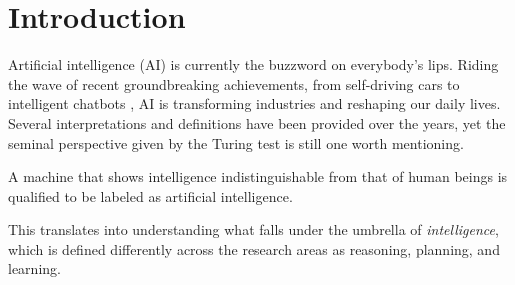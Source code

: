 \documentclass[a4paper,12pt,times,numbered,print,index]{Classes/PhDThesisPSnPDF}
\begin{document}
\frontmatter

% 
\newpage
% 

% 



\tableofcontents

\mainmatter
\sloppy
% 

\chapter{Introduction}

Artificial intelligence (AI) is currently the buzzword on everybody's lips.
Riding the wave of recent groundbreaking achievements, from self-driving cars \citep{} to intelligent chatbots \citep{}, AI is transforming industries and reshaping our daily lives.
Several interpretations and definitions have been provided over the years, yet the seminal perspective given by the Turing test \citep{turing1980computing} is still one worth mentioning.
\begin{definition}
A machine that shows intelligence indistinguishable from that of human beings is qualified to be labeled as artificial intelligence.
\end{definition}
This translates into understanding what falls under the umbrella of \textit{intelligence}, which is defined differently across the research areas as reasoning, planning, and learning.
\end{document}
